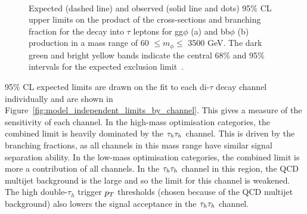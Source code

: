 \begin{figure}[!hbtp]
\centering
     \\
\caption[Plots of the model-independent limits on the cross-sections of gluon fusion and b-associated production multiplied by the $\tau\tau$ branching fraction.]{Expected (dashed line) and observed (solid line and dots) 95\% CL upper limits on the product of the cross-sections and branching fraction for the decay into $\tau$ leptons for gg$\phi$ (a) and bb$\phi$ (b) production in a mass range of 60 $\leq m_{\phi} \leq$ 3500 GeV.  The dark green and bright yellow bands indicate the central 68\% and 95\% intervals for the expected exclusion limit~\cite{CMS:2022rbd}.}
\label{fig:model_independent_limits}
\end{figure}

95\% \ac{CL} expected limits are drawn on the fit to each di-$\tau$ decay channel individually and are shown in Figure~\ref{fig:model_independent_limits_by_channel}.
This gives a measure of the sensitivity of each channel.
In the high-mass optimisation categories, the combined limit is heavily dominated by the $\tau_{h}\tau_{h}$ channel.
This is driven by the branching fractions, as all channels in this mass range have similar signal separation ability.
In the low-mass optimisation categories, the combined limit is more a contribution of all channels. 
In the $\tau_{h}\tau_{h}$ channel in this region, the \ac{QCD} multijet background is the large and so the limit for this channel is weakened.
The high double-$\tau_h$ trigger $p_{T}$ thresholds (chosen because of the \ac{QCD} multijet background) also lowers the signal acceptance in the $\tau_{h}\tau_{h}$ channel. \\

